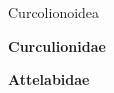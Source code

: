 \documentclass[letterpaper,10pt]{article}
\begin{document}
{%
\makebox[0.40cm]{}  Curcolionoidea \par
\makebox[0.6cm]{}  \textbf{Curculionidae} \par
\makebox[0.6cm]{}  \textbf{Attelabidae} \par
}
\end{document}
